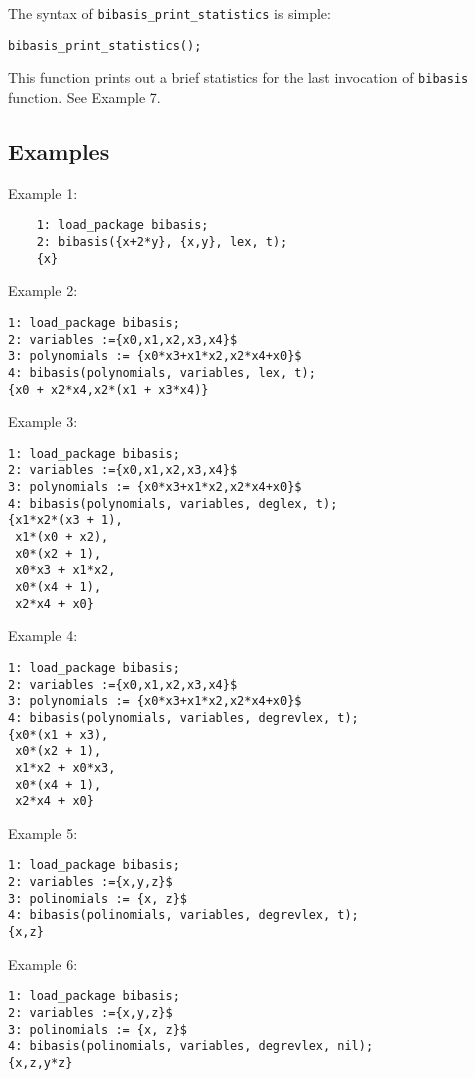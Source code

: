 \hypertarget{operator:BIBASIS_PRINT_STATISTICS}{}
\noindent The syntax of \texttt{bibasis\_print\_statistics} is simple:
\begin{center}
    \texttt{bibasis\_print\_statistics();}
\end{center}
This function prints out a brief statistics for the last invocation of \texttt{bibasis} function. See Example 7.

\subsection{Examples}


Example 1:
\begin{verbatim}
    1: load_package bibasis;
    2: bibasis({x+2*y}, {x,y}, lex, t);
    {x}
\end{verbatim}

\noindent Example 2:
\begin{verbatim}
1: load_package bibasis;
2: variables :={x0,x1,x2,x3,x4}$
3: polynomials := {x0*x3+x1*x2,x2*x4+x0}$
4: bibasis(polynomials, variables, lex, t);
{x0 + x2*x4,x2*(x1 + x3*x4)}
\end{verbatim}

\noindent Example 3:
\begin{verbatim}
1: load_package bibasis;
2: variables :={x0,x1,x2,x3,x4}$
3: polynomials := {x0*x3+x1*x2,x2*x4+x0}$
4: bibasis(polynomials, variables, deglex, t);
{x1*x2*(x3 + 1),
 x1*(x0 + x2),
 x0*(x2 + 1),
 x0*x3 + x1*x2,
 x0*(x4 + 1),
 x2*x4 + x0}
\end{verbatim}

\noindent Example 4:
\begin{verbatim}
1: load_package bibasis;
2: variables :={x0,x1,x2,x3,x4}$
3: polynomials := {x0*x3+x1*x2,x2*x4+x0}$
4: bibasis(polynomials, variables, degrevlex, t);
{x0*(x1 + x3),
 x0*(x2 + 1),
 x1*x2 + x0*x3,
 x0*(x4 + 1),
 x2*x4 + x0}
\end{verbatim}

\noindent Example 5:
\begin{verbatim}
1: load_package bibasis;
2: variables :={x,y,z}$
3: polinomials := {x, z}$
4: bibasis(polinomials, variables, degrevlex, t);
{x,z}
\end{verbatim}

\noindent Example 6:
\begin{verbatim}
1: load_package bibasis;
2: variables :={x,y,z}$
3: polinomials := {x, z}$
4: bibasis(polinomials, variables, degrevlex, nil);
{x,z,y*z}
\end{verbatim}

